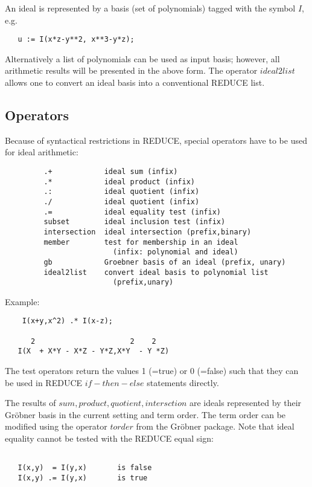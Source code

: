 An ideal is represented by a basis (set of polynomials) tagged
with the symbol $I$, e.g.
\begin{verbatim}
   u := I(x*z-y**2, x**3-y*z);
\end{verbatim}
Alternatively a list of polynomials can be used as input basis; however,
all arithmetic results will be presented in the above form. The
operator $ideal2list$ allows one to convert an ideal basis into a
conventional REDUCE list.

\subsection{Operators}

Because of syntactical restrictions in REDUCE, special operators
have to be used for ideal arithmetic: 

\begin{verbatim}
         .+            ideal sum (infix)
         .*            ideal product (infix)
         .:            ideal quotient (infix)
         ./            ideal quotient (infix)
         .=            ideal equality test (infix)
         subset        ideal inclusion test (infix)
         intersection  ideal intersection (prefix,binary)
         member        test for membership in an ideal
                         (infix: polynomial and ideal)
         gb            Groebner basis of an ideal (prefix, unary)
         ideal2list    convert ideal basis to polynomial list 
                         (prefix,unary)
\end{verbatim}

Example:

\begin{verbatim}
    I(x+y,x^2) .* I(x-z);

      2                      2    2
   I(X  + X*Y - X*Z - Y*Z,X*Y  - Y *Z)
\end{verbatim}

The test operators return the values 1 (=true) or 0 (=false)
such that they can be used in REDUCE $if-then-else$ statements
directly.

The results of $sum,product, quotient,intersction$ are ideals
represented by their Gr\"obner basis in the current setting and
term order. The term order can be modified using the operator
$torder$ from the Gr\"obner package. Note that ideal equality 
cannot be tested with the REDUCE equal sign:

\begin{verbatim}

   I(x,y)  = I(y,x)       is false
   I(x,y) .= I(y,x)       is true

\end{verbatim}

